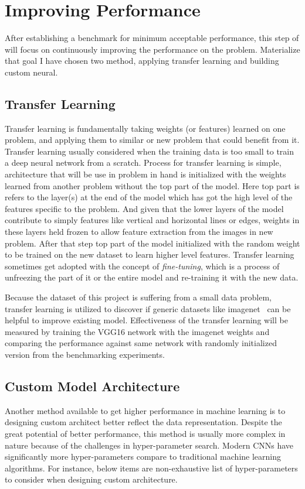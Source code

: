 
\section{Improving Performance}
After establishing a benchmark for minimum acceptable performance, this step of will focus on continuously improving the performance on the problem. 
Materialize that goal I have chosen two method, applying transfer learning and building custom neural.

\subsection{Transfer Learning} \label{subsec:transferlearning}
Transfer learning is fundamentally taking weights (or features) learned on one problem, and applying them to similar or new problem that could benefit from it.
Transfer learning usually considered when the training data is too small to train a deep neural network from a scratch.
Process for transfer learning is simple, architecture that will be use in problem in hand is initialized with the weights learned from another problem without the top part of the model.
Here top part is refers to the layer(s) at the end of the model which has got the high level of the features specific to the problem.
And given that the lower layers of the model contribute to simply features like vertical and horizontal lines or edges, weights in these layers held frozen to allow feature extraction from the images in new problem.
After that step top part of the model initialized with the random weight to be trained on the new dataset to learn higher level features.
Transfer learning sometimes get adopted with the concept of \emph{fine-tuning}, which is a process of unfreezing the part of it or the entire model and re-training it with the new data.

Because the dataset of this project is suffering from a small data problem, transfer learning is utilized to discover if generic datasets like imagenet~\cite{imagenet} can be helpful to improve existing model.
Effectiveness of the transfer learning will be measured by training the VGG16 network with the imagenet weights and comparing the performance against same network with randomly initialized version from the benchmarking experiments.

\subsection{Custom Model Architecture}
Another method available to get higher performance in machine learning is to designing custom architect better reflect the data representation.
Despite the great potential of better performance, this method is usually more complex in nature because of the challenges in hyper-parameter search.
Modern CNNs have significantly more hyper-parameters compare to traditional machine learning algorithms. 
For instance, below items are non-exhaustive list of hyper-parameters to consider when designing custom architecture.

